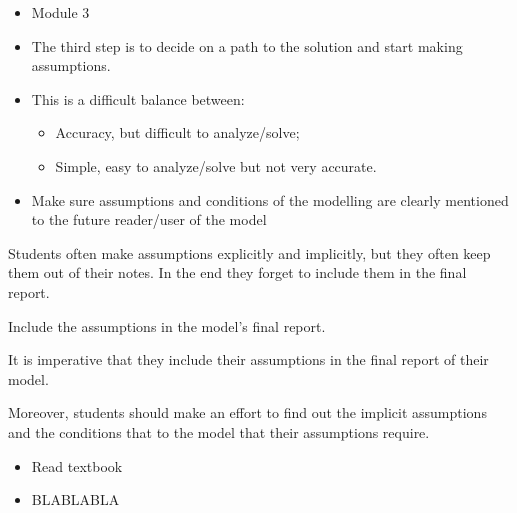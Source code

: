 \begin{lesson}

	\begin{itemize}
		\item Module 3
	\end{itemize}

	\begin{itemize}
		\item The third step is to decide on a path to the solution and start making assumptions.
		
		\item This is a difficult balance between:
		\begin{itemize}
			\item Accuracy, but difficult to analyze/solve;
			\item Simple, easy to analyze/solve but not very accurate.
		\end{itemize}

	\item Make sure assumptions and conditions of the modelling are clearly mentioned to the future reader/user of the model
	\end{itemize}
	
	

Students often make assumptions explicitly and implicitly, but they often keep them out of their notes. In the end they forget to include them in the final report.

\begin{annotation}
\begin{goals}
	Include the assumptions in the model's final report.
\end{goals}
\end{annotation}
It is imperative that they include their assumptions in the final report of their model.

Moreover, students should make an effort to find out the implicit assumptions and the conditions that to the model that their assumptions require.


\begin{itemize}
	\item Read textbook
\end{itemize}

\begin{itemize}
	\item BLABLABLA
\end{itemize}


\end{lesson}
